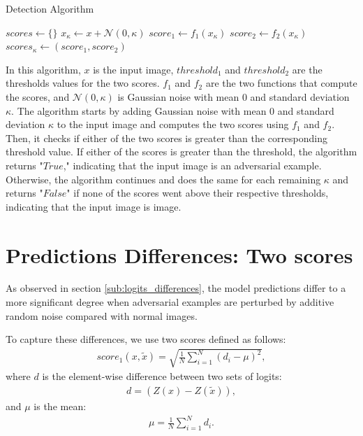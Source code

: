 \begin{algorithm}
    \begin{algorithmic}[1]
        \label{alg:detection}
        \caption{Detection Algorithm}
        \State $scores \gets \{\}$
        \State $x_{\kappa} \gets x + \mathcal{N}(0, \kappa)$
        \State $score_1 \gets f_1(x_{\kappa})$
        \State $score_2 \gets f_2(x_{\kappa})$
        \State $scores_{\kappa} \gets (score_1, score_2)$
        \State {}
        \EndIf
        \EndFor
        \State {}
        \EndProcedure
    \end{algorithmic}
\end{algorithm}

In this algorithm, $x$ is the input image, $threshold_1$ and $threshold_2$ are
the thresholds values for the two scores. $f_1$ and $f_2$ are the two functions
that compute the scores, and $\mathcal{N}(0, \kappa)$ is Gaussian noise with
mean 0 and standard deviation $\kappa$. The algorithm starts by adding Gaussian
noise with mean 0 and standard deviation $\kappa$ to the input image and
computes the two scores using $f_1$ and $f_2$. Then, it checks if either of the
two scores is greater than the corresponding threshold value. If either of the
scores is greater than the threshold, the algorithm returns "$True$," indicating
that the input image is an adversarial example. Otherwise, the algorithm
continues and does the same for each remaining $\kappa$ and returns "$False$"
if none of the scores went above their respective thresholds, indicating that
the input image is image.



\section{Predictions Differences: Two scores}
\label{sub:detection_metrics}
As observed in section \ref{sub:logits_differences}, the model predictions
differ to a more significant degree when adversarial examples are perturbed by
additive random noise compared with normal images.

To capture these differences, we use two scores defined as follows:
\begin{align}
    \label{eq:score1}
    score_{1}{(x,\tilde{x})}=\sqrt{\frac{1}{N}\sum_{i=1}^{N}(d_{i}-\mu)^{2}},
\end{align}
where $d$ is the element-wise difference between two sets of logits:
\begin{align}
    \label{eq:diff}
    d=(Z(x)-Z(\tilde{x})),
\end{align}
and $\mu$ is the mean:
\begin{align}
    \label{eq:mean_mu}
    \mu=\frac{1}{N}\sum_{i=1}^{N}d_{i}.
\end{align}

